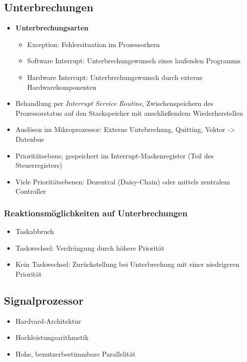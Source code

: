 \subsection{Unterbrechungen}
\begin{itemize}
	\item \textbf{Unterbrechungsarten}
	\begin{itemize}
		\item Exception: Fehlersituation im Prozessorkern
		\item Software Interrupt: Unterbrechungswunsch eines laufenden Programms
		\item Hardware Interrupt: Unterbrechungswunsch durch externe Hardwarekomponenten
	\end{itemize}
	\item Behandlung per \textit{Interrupt Service Routine}, Zwischenspeichern des Prozessorstatus auf den Stackspeicher mit anschließendem Wiederherstellen
	\item Auslösen im Mikroprozessor: Externe Untebrechung, Quitting, Vektor -> Datenbus
	\item Prioritätsebene, gespeichert im Interrupt-Maskenregister (Teil des Steuerregisters)
	\item Viele Prioritätsebenen: Dezentral (Daisy-Chain) oder mittels zentralem Controller
\end{itemize}

\subsubsection{Reaktionsmöglichkeiten auf Unterbrechungen}
\begin{itemize}
	\item Taskabbruch
	\item Taskwechsel: Verdrängung durch höhere Priorität
	\item Kein Taskwechsel: Zurückstellung bei Unterbrechung mit einer niedrigeren Priorität
\end{itemize}


\subsection{Signalprozessor}
\begin{itemize}
	\item Hardvard-Architektur
	\item Hochleistungsarithmetik
	\item Hohe, benutzerbestimmbare Parallelität
\end{itemize}


